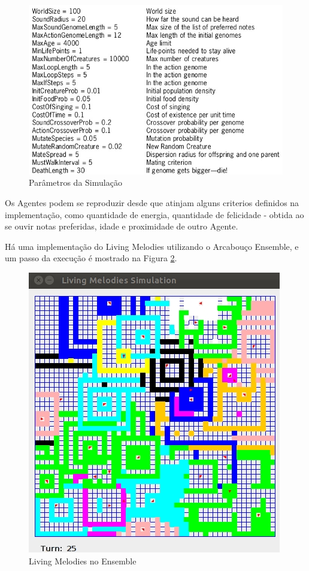 \documentclass[a4paper, 11pt, twoside]{article}
\begin{document}
\begin{multicols}{2}
\begin{figure}[H]
  \centering
  \includegraphics[scale=0.44]{table4.jpg}
  \caption{Parâmetros da Simulação~\cite{d01living}}
  \label{fig:livingmel2}
\end{figure}

Os Agentes podem se reproduzir desde que atinjam alguns criterios definidos 
na implementação, como quantidade de energia, quantidade de felicidade - 
obtida ao se ouvir notas preferidas, idade e proximidade de outro Agente.

Há uma implementação do Living Melodies utilizando o Arcabouço Ensemble, e um 
passo da execução é mostrado na Figura \ref{fig:livingensemble}.

\begin{figure}[H]
  \centering
  \includegraphics[scale=0.44]{livingmel.jpg}
  \caption{Living Melodies no Ensemble~\cite{leandro11}}
  \label{fig:livingensemble}
\end{figure}


\end{multicols}
\end{document}
